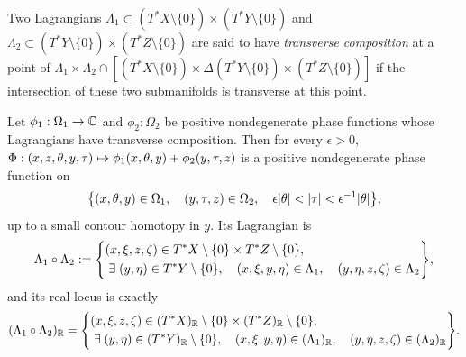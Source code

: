\documentclass[AHL,Unicode,longabstracts,published]{cedram}
\newcommand\1{\mathds{1}}
\newcommand{\R}{\mathbb{R}}
\newcommand{\C}{\mathbb{C}}
\let\oldexists\exists
\renewcommand*{\exists}{\mathrel{\oldexists}}
\renewcommand*{\to}{\mathchoice{\longrightarrow}{\rightarrow}{\rightarrow}{\rightarrow}}
\let\oldmapsto\mapsto
\renewcommand*{\mapsto}{\mathchoice{\longmapsto}{\oldmapsto}{\oldmapsto}{\oldmapsto}}
\let\originalleft\left
\let\originalright\right
\renewcommand{\left}{\mathopen{}\mathclose\bgroup\originalleft}
\renewcommand{\right}{\aftergroup\egroup\originalright}
\begin{document}
\begin{defi}\label{def:composition}
Two Lagrangians $\Lambda_1\subset (T^*X\setminus \{0\})\times (T^*Y\setminus \{0\})$ and $\Lambda_2\subset (T^*Y\setminus \{0\})\times (T^*Z\setminus \{0\})$ are said to have \emph{transverse composition} at a point of $\Lambda_1\times \Lambda_2\cap [(T^*X\setminus \{0\})\times
\Delta(T^*Y\setminus \{0\})\times (T^*Z\setminus \{0\})]$ if the intersection of these two submanifolds is transverse at this point.
\end{defi}

\begin{prop}\label{prop:compo_phase}
Let $\phi_1:\Omega_1\to \C$ and $\phi_2:\Omega_2$ be positive nondegenerate phase functions whose Lagrangians have transverse composition. Then for every $\epsilon>0$, $\Phi: (x,z,\theta,y,\tau)\mapsto \phi_1(x,\theta,y)+\phi_2(y,\tau,z)$ is a positive nondegenerate phase function on
\[
\left\{(x,\theta,y)\in \Omega_1,\quad(y,\tau,z)\in
\Omega_2,\quad\epsilon|\theta|<|\tau|<\epsilon^{-1}|\theta|\right\},
\]
up to a small contour homotopy in $y$. Its Lagrangian is
\begin{equation*}
\Lambda_1\circ \Lambda_2:=\left\{
\begin{aligned}
&(x,\xi,z,\zeta)\in T^*X\setminus
\{0\}\times T^*Z\setminus \{0\},\\
&\exists (y,\eta)\in T^*Y\setminus
\{0\}, \quad(x,\xi,y,\eta)\in \Lambda_1,\quad(y,\eta,z,\zeta)\in
\Lambda_2
\end{aligned}
\right\},
\end{equation*}
and its real locus is exactly
\begin{equation*}
(\Lambda_1\circ \Lambda_2)_\R=\left\{
\begin{aligned}
&(x,\xi,z,\zeta)\in (T^*X)_{\R}\setminus
\{0\}\times (T^*Z)_{\R}\setminus \{0\},\\
&\exists (y,\eta)\in (T^*Y)_{\R}\setminus
\{0\}, \quad(x,\xi,y,\eta)\in (\Lambda_1)_{\R},\quad(y,\eta,z,\zeta)\in (\Lambda_2)_{\R}
\end{aligned}
\right\}.
\end{equation*}
\end{prop}
\end{document}
